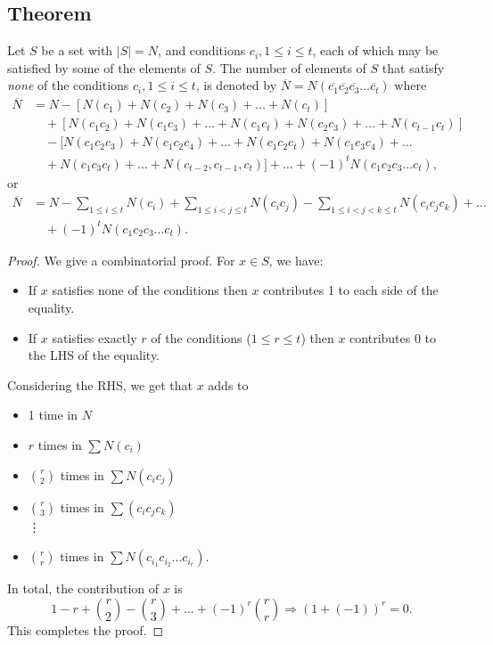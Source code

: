 \documentclass[11pt]{article}
\begin{document}
    \subsection{Theorem}

    Let $S$ be a set with \(|S| = N\), and conditions \(c_i, 1 \leq i \leq t\), each of which may be satisfied by some of the elements of $S$. The number of elements of $S$ that satisfy \emph{none} of the conditions \(c_i, 1 \leq i \leq t\), is denoted by \(\overline{N} = N(\overline{c_1} \overline{c_2} \overline{c_3} \dots \overline{c_t})\) where 
    \begin{align*}
        \overline{N} &= N - [N(c_1) + N(c_2) + N(c_3) + \dots + N(c_t)] \\
                     & \quad + [N(c_1 c_2) + N(c_1 c_3) + \dots + N(c_1 c_t) + N(c_2 c_3) + \dots + N(c_{t-1} c_t)] \\ 
                     & \quad - [N(c_1 c_2 c_3) + N(c_1 c_2 c_4) + \dots + N(c_1 c_2 c_t) + N(c_1 c_3 c_4) + \dots \\
                     & \quad + N(c_1 c_3 c_t) + \dots + N(c_{t-2}, c_{t-1}, c_t)] + \dots + (-1)^t N(c_1 c_2 c_3 \dots c_t),
    \end{align*}
    or 
    \begin{align*}
        \overline{N} &= N - \sum_{1 \leq i \leq t} N(c_i) + \sum_{1 \leq i < j \leq t} N(c_i c_j) - \sum_{1 \leq i < j < k \leq t} N(c_i c_j c_k) + \dots \\
                     & \quad + (-1)^t N(c_1 c_2 c_3 \dots c_t).
    \end{align*}

    \begin{proof}
        We give a combinatorial proof. For \(x \in S\), we have:
        \begin{itemize}
            \item If $x$ satisfies none of the conditions then $x$ contributes 1 to each side of the equality.
            \item If $x$ satisfies exactly $r$ of the conditions (\(1 \leq r \leq t\)) then $x$ contributes 0 to the LHS of the equality. 
        \end{itemize}
        Considering the RHS, we get that $x$ adds to 
        \begin{itemize}
            \item 1 time in $N$
            \item $r$ times in \(\sum N(c_i)\)
            \item \(\binom{r}{2}\) times in \(\sum N(c_i c_j)\)
            \item \(\binom{r}{3}\) times in \(\sum (c_i c_j c_k)\) \\
            \vdots
            \item \(\binom{r}{r}\) times in \(\sum N(c_{i_1} c_{i_2} \dots c_{i_r})\).
        \end{itemize}
        In total, the contribution of $x$ is \[1 - r + \binom{r}{2} - \binom{r}{3} + \dots + (-1)^r \binom{r}{r} \Rightarrow (1+(-1))^r = 0.\] This completes the proof.
    \end{proof}
\end{document}
